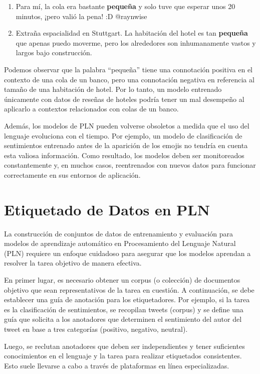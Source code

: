 \begin{enumerate}
   \item Para mí, la cola era bastante \textcolor[rgb]{0.00,0.00,1.00}{\textbf{pequeña}} y solo tuve que esperar unos 20 minutos, ¡pero valió la pena! :D @raynwise
   \item Extraña espacialidad en Stuttgart. La habitación del hotel es tan \textcolor[rgb]{1.00,0.00,0.00}{\textbf{pequeña}} que apenas puedo moverme, pero los alrededores son inhumanamente vastos y largos bajo construcción.
\end{enumerate}

Podemos observar que la palabra ``pequeña'' tiene una connotación positiva en el contexto de una cola de un banco, pero una connotación negativa en referencia al tamaño de una habitación de hotel. Por lo tanto, un modelo entrenado únicamente con datos de reseñas de hoteles podría tener un mal desempeño al aplicarlo a contextos relacionados con colas de un banco.

Además, los modelos de PLN pueden volverse obsoletos a medida que el uso del lenguaje evoluciona con el tiempo. Por ejemplo, un modelo de clasificación de sentimientos entrenado antes de la aparición de los emojis no tendría en cuenta esta valiosa información. Como resultado, los modelos deben ser monitoreados constantemente y, en muchos casos, reentrenados con nuevos datos para funcionar correctamente en sus entornos de aplicación.

\section{Etiquetado de Datos en PLN}

La construcción de conjuntos de datos de entrenamiento y evaluación para modelos de aprendizaje automático en Procesamiento del Lenguaje Natural (PLN) requiere un enfoque cuidadoso para asegurar que los modelos aprendan a resolver la tarea objetivo de manera efectiva.

En primer lugar, es necesario obtener un corpus (o colección) de documentos objetivo que sean representativos de la tarea en cuestión. A continuación, se debe establecer una guía de anotación para los etiquetadores. Por ejemplo, si la tarea es la clasificación de sentimientos, se recopilan tweets (corpus) y se define una guía que solicita a los anotadores que determinen el sentimiento del autor del tweet en base a tres categorías (positivo, negativo, neutral).

Luego, se reclutan anotadores que deben ser independientes y tener suficientes conocimientos en el lenguaje y la tarea para realizar etiquetados consistentes. Esto suele llevarse a cabo a través de plataformas en línea especializadas.

